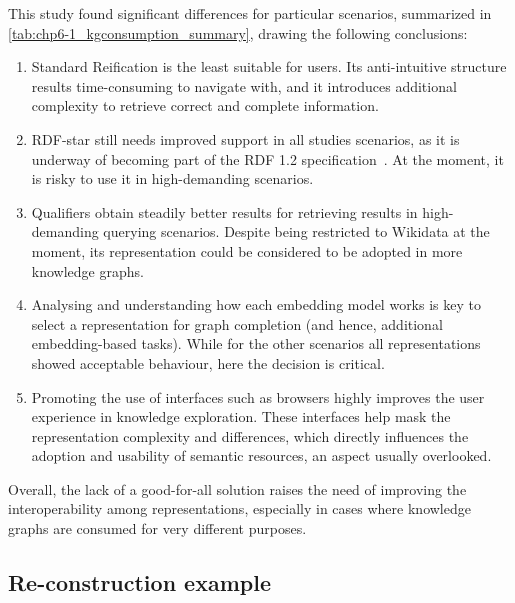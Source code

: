 This study found significant differences for particular scenarios, summarized in \cref{tab:chp6-1_kgconsumption_summary}, drawing the following conclusions: 
\begin{enumerate}
    \item Standard Reification is the least suitable for users. Its anti-intuitive structure results time-consuming to navigate with, and it introduces additional complexity to retrieve correct and complete information.
    \item RDF-star still needs improved support in all studies scenarios, as it is underway of becoming part of the RDF 1.2 specification~\cite{hartig2023rdf}. At the moment, it is risky to use it in high-demanding scenarios.
    \item Qualifiers obtain steadily better results for retrieving results in high-demanding querying scenarios. Despite being restricted to Wikidata at the moment, its representation could be considered to be adopted in more knowledge graphs.
    \item Analysing and understanding how each embedding model works is key to select a representation for graph completion (and hence, additional embedding-based tasks). While for the other scenarios all representations showed acceptable behaviour, here the decision is critical.
    \item Promoting the use of interfaces such as browsers highly improves the user experience in knowledge exploration. These interfaces help mask the representation complexity and differences, which directly influences the adoption and usability of semantic resources, an aspect usually overlooked.
\end{enumerate}

Overall, the lack of a good-for-all solution raises the need of improving the interoperability among representations, especially in cases where knowledge graphs are consumed for very different purposes.



\subsection{Re-construction example}

